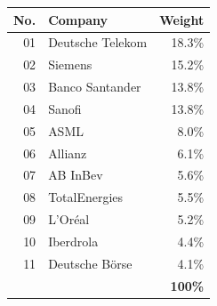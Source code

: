 \begin{tabular}{@{}rlr@{}}
\toprule
\textbf{No.} & \textbf{Company} & \textbf{Weight} \\
\midrule
01 & Deutsche Telekom & 18.3\% \\
02 & Siemens & 15.2\% \\
03 & Banco Santander & 13.8\% \\
04 & Sanofi & 13.8\% \\
05 & ASML & 8.0\% \\
06 & Allianz & 6.1\% \\
07 & AB InBev & 5.6\% \\
08 & TotalEnergies & 5.5\% \\
09 & L'Or\'eal & 5.2\% \\
10 & Iberdrola & 4.4\% \\
11 & Deutsche B\"orse & 4.1\% \\
\midrule
 & & \textbf{100\%} \\
\bottomrule
\end{tabular}

